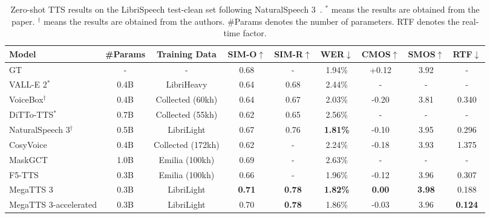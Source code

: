 
\begin{table*}[!t]
\small
\centering
\begin{tabular}{@{}l|cc|ccc|cc|c@{}}
\toprule
\bfseries Model & \bfseries \#Params & \bfseries Training Data & \bfseries SIM-O$\uparrow$ & \bfseries SIM-R$\uparrow$ & \bfseries WER$\downarrow$ & \bfseries CMOS$\uparrow$& \bfseries SMOS$\uparrow$ & \bfseries RTF$\downarrow$ \\      
\midrule
GT & - & - & 0.68 & - & 1.94\% & +0.12 & 3.92 & - \\
\midrule
VALL-E 2$^{*}$ & 0.4B & LibriHeavy & 0.64 & 0.68 & 2.44\% & - & - & - \\
VoiceBox$^{\dag}$ & 0.4B & Collected (60kh) &  0.64 & 0.67 & 2.03\% & -0.20 & 3.81 & 0.340 \\
DiTTo-TTS$^{*}$ & 0.7B & Collected (55kh) & 0.62 & 0.65 & 2.56\% & - & - & - \\
NaturalSpeech 3$^{\dag}$ & 0.5B & LibriLight & 0.67 & 0.76 & \bfseries 1.81\% & -0.10 & 3.95 & 0.296\\
CosyVoice & 0.4B & Collected (172kh) & 0.62 & - & 2.24\% & -0.18 & 3.93 & 1.375\\
MaskGCT & 1.0B & Emilia (100kh) & 0.69 & - & 2.63\% & - & - & - \\
F5-TTS & 0.3B & Emilia (100kh) & 0.66 & - & 1.96\% & -0.12 & 3.96 & 0.307 \\
\midrule
MegaTTS 3 & 0.3B & LibriLight & \bfseries 0.71 & \bfseries 0.78 & \bfseries 1.82\%  & \bfseries 0.00 & \bfseries 3.98 & 0.188 \\
MegaTTS 3-accelerated & 0.3B & LibriLight & 0.70 & \bfseries0.78 & 1.86\%  & -0.03  & 3.96 & \bfseries 0.124 \\

\bottomrule
\end{tabular}
\caption{Zero-shot TTS results on the LibriSpeech test-clean set following NaturalSpeech 3~\citep{ju2024naturalspeech}. $^{*}$ means the results are obtained from the paper. $^{\dag}$ means the
results are obtained from the authors. \#Params denotes the number of parameters. RTF denotes the real-time factor.}
\label{table:en_zs_tts}
\end{table*}

